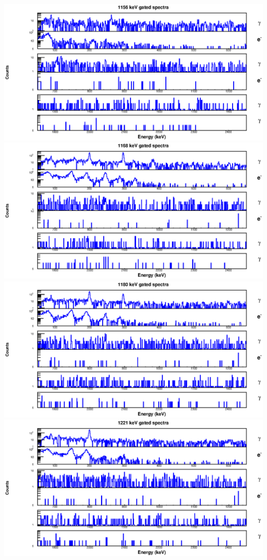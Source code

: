 \begin{landscape}
\includegraphics[scale=1.2]{156Gd_Appendix/1156_combined.eps}
\includegraphics[scale=1.2]{156Gd_Appendix/1168_combined.eps}
\includegraphics[scale=1.2]{156Gd_Appendix/1180_combined.eps}
\includegraphics[scale=1.2]{156Gd_Appendix/1221_combined.eps}

\end{landscape}
